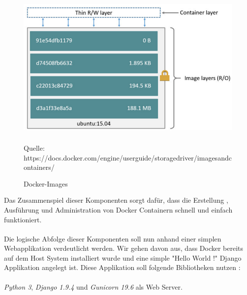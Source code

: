 \documentclass[12pt,toc=bib,toc=listof]{scrreprt}
\begin{document}
\begin{figure}
	\centering
	\caption{Docker-Images}
	\includegraphics[width=15cm, height=8cm, scale=0.3]{container-images.png}
	Quelle: https://docs.docker.com/engine/userguide/storagedriver/imagesandcontainers/
\end{figure}
Das Zusammenspiel dieser Komponenten sorgt dafür, dass die Erstellung , Ausführung und Administration von Docker Containern schnell und einfach funktioniert.\\
\\
Die logische Abfolge dieser Komponenten soll nun anhand einer simplen Webapplikation verdeutlicht werden.
Wir gehen davon aus, dass Docker bereits auf dem Host System installiert wurde und eine  simple "Hello World !" Django Applikation angelegt ist.
Diese Applikation soll folgende Bibliotheken nutzen :\\
\\
\textit{Python 3}, \textit{Django 1.9.4} und \textit{Gunicorn 19.6} als Web Server.
\end{document}
